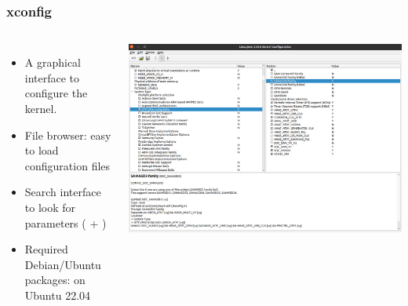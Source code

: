 \begin{frame}
  \frametitle{xconfig}
  \begin{columns}
    \begin{itemize}
    \item A graphical interface to configure the kernel.
    \item File browser: easy to load configuration files
    \item Search interface to look for parameters (\code{[Ctrl]} + \code{[f]})
    \item Required Debian/Ubuntu packages:  on Ubuntu 22.04
    \end{itemize}
    \includegraphics[width=\textwidth]{slides/linux-kernel-intro-configuration/xconfig-screenshot.png}
  \end{columns}
\end{frame}


